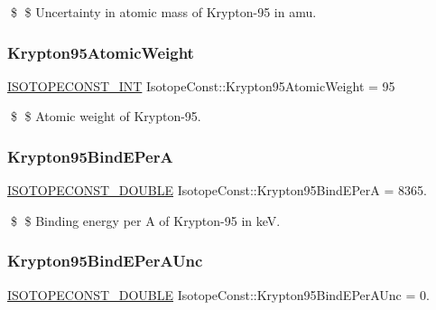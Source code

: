 \$ \$ Uncertainty in atomic mass of Krypton-\/95 in amu. \mbox{\label{group___isotope_const-_krypton-_kr95_gaf70ac086e14b5708aa0c9f77f8765c21}} 
\subsubsection{\texorpdfstring{Krypton95\+Atomic\+Weight}{Krypton95AtomicWeight}}
{\footnotesize\ttfamily \mbox{\hyperlink{group___isotope_const-_macros_ga5f18360b3e99483a35c32d789e62621c}{I\+S\+O\+T\+O\+P\+E\+C\+O\+N\+S\+T\+\_\+\+I\+NT}} Isotope\+Const\+::\+Krypton95\+Atomic\+Weight = 95}

\$ \$ Atomic weight of Krypton-\/95. \mbox{\label{group___isotope_const-_krypton-_kr95_ga7f94220e693cfc552cff26dcda7fd523}} 
\subsubsection{\texorpdfstring{Krypton95\+Bind\+E\+PerA}{Krypton95BindEPerA}}
{\footnotesize\ttfamily \mbox{\hyperlink{group___isotope_const-_macros_ga8f45a7272ce02c0b4c65c44636ed719a}{I\+S\+O\+T\+O\+P\+E\+C\+O\+N\+S\+T\+\_\+\+D\+O\+U\+B\+LE}} Isotope\+Const\+::\+Krypton95\+Bind\+E\+PerA = 8365.}

\$ \$ Binding energy per A of Krypton-\/95 in keV. \mbox{\label{group___isotope_const-_krypton-_kr95_gaa31da8e1e523e48d3f139efcc064580b}} 
\subsubsection{\texorpdfstring{Krypton95\+Bind\+E\+Per\+A\+Unc}{Krypton95BindEPerAUnc}}
{\footnotesize\ttfamily \mbox{\hyperlink{group___isotope_const-_macros_ga8f45a7272ce02c0b4c65c44636ed719a}{I\+S\+O\+T\+O\+P\+E\+C\+O\+N\+S\+T\+\_\+\+D\+O\+U\+B\+LE}} Isotope\+Const\+::\+Krypton95\+Bind\+E\+Per\+A\+Unc = 0.}

